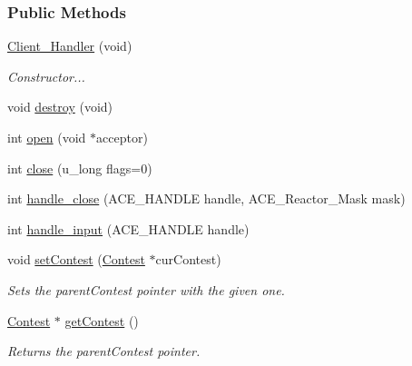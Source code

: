 \subsubsection*{Public Methods}
\begin{CompactItemize}
\item 
\hyperlink{classClient__Handler_Client__Handlera0}{Client\_\-Handler} (void)
\begin{CompactList}\small\item\em Constructor...\item\end{CompactList}\item 
void \hyperlink{classClient__Handler_Client__Handlera1}{destroy} (void)
\item 
int \hyperlink{classClient__Handler_Client__Handlera2}{open} (void $\ast$acceptor)
\item 
int \hyperlink{classClient__Handler_Client__Handlera3}{close} (u\_\-long flags=0)
\item 
int \hyperlink{classClient__Handler_Client__Handlera4}{handle\_\-close} (ACE\_\-HANDLE handle, ACE\_\-Reactor\_\-Mask mask)
\item 
int \hyperlink{classClient__Handler_Client__Handlera5}{handle\_\-input} (ACE\_\-HANDLE handle)
\item 
void \hyperlink{classClient__Handler_Client__Handlera6}{set\-Contest} (\hyperlink{classContest}{Contest} $\ast$cur\-Contest)
\begin{CompactList}\small\item\em Sets the parent\-Contest pointer with the given one.\item\end{CompactList}\item 
\hyperlink{classContest}{Contest} $\ast$ \hyperlink{classClient__Handler_Client__Handlera7}{get\-Contest} ()
\begin{CompactList}\small\item\em Returns the parent\-Contest pointer.\item\end{CompactList}\end{CompactItemize}
